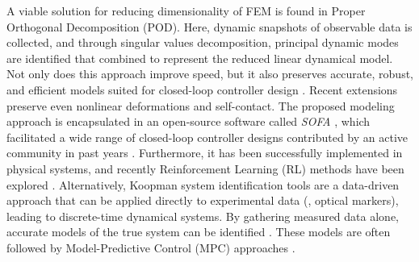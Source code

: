 A viable solution for reducing dimensionality of FEM is found in Proper Orthogonal Decomposition (POD). Here, dynamic snapshots of observable data is collected, and through singular values decomposition, principal dynamic modes are identified that combined  to represent the reduced linear dynamical model. Not only does this approach improve speed, but it also preserves accurate, robust, and efficient models suited for closed-loop controller design \cite{Goury2018}. Recent extensions \cite{Sifakis2012Aug} preserve even nonlinear deformations and self-contact. The proposed modeling approach is encapsulated in an open-source software called \textit{SOFA} \cite{Duriez2016, Coevoet2017Feb}, which facilitated a wide range of closed-loop controller designs contributed by an active community in past years \cite{Largilliere2015,Goury2018,Duriez2016,Wu2021Feb,Li2022Feb}. Furthermore, it has been successfully implemented in physical systems, and recently Reinforcement Learning (RL) methods have been explored \cite{Schegg2022}. Alternatively, Koopman system identification tools are a data-driven approach that can be applied directly to experimental data (\ie, optical markers), leading to discrete-time dynamical systems. By gathering measured data alone, accurate models of the true system can be identified \cite{Bruder2019,Komeno2022Oct}. These models are often followed by Model-Predictive Control (MPC) approaches \cite{Bruder2020Dec,Bruder2019}. 



